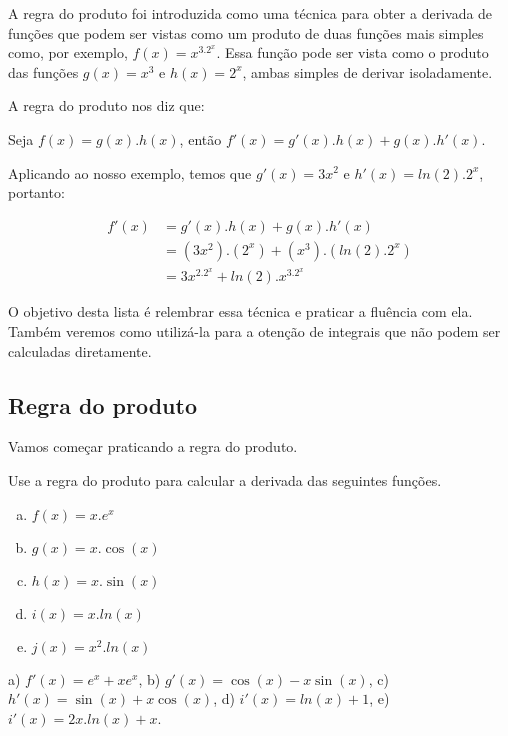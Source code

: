 \documentclass[main_estudante.tex]{subfiles}
\begin{document}
A regra do produto foi introduzida como uma técnica para obter a derivada de funções que podem ser vistas como um produto de duas funções mais simples como, por exemplo, $f(x)=x^3.2^x$. Essa função pode ser vista como o produto das funções $g(x)=x^3$ e $h(x)=2^x$, ambas simples de derivar isoladamente.

A regra do produto nos diz que:

\begin{shaded*}
Seja $f(x)=g(x).h(x)$, então $f'(x)=g'(x).h(x)+g(x).h'(x)$.
\end{shaded*}

Aplicando ao nosso exemplo, temos que $g'(x)=3x^2$ e $h'(x)=ln(2).2^x$, portanto:

\begin{align*}
f'(x) &= g'(x).h(x)+g(x).h'(x) \\
 &= (3x^2) . (2^x) + (x^3) . (ln(2).2^x) \\
 &= 3x^2.2^x + ln(2).x^3.2^x
\end{align*}

O objetivo desta lista é relembrar essa técnica e praticar a fluência com ela. Também veremos como utilizá-la para a otenção de integrais que não podem ser calculadas diretamente.

\subsection*{Regra do produto}

Vamos começar praticando a regra do produto.


\begin{questao}
Use a regra do produto para calcular a derivada das seguintes funções.
\begin{enumerate}[a)]
\item $f(x)=x . e^x$
\item $g(x)=x . \cos(x)$
\item $h(x)=x . \sin(x)$
\item $i(x)=x. ln(x)$
\item $j(x)=x^2 . ln(x)$
\end{enumerate}
\end{questao}

\begin{gabarito}
	\begin{gabaritoQuestao}
		a) $f'(x)=e^x+xe^x$, b) $g'(x)=\cos(x)-x\sin(x)$, c) $h'(x)=\sin(x)+x\cos(x)$, d) $i'(x)=ln(x)+1$, e) $i'(x)=2x.ln(x)+x$.
	\end{gabaritoQuestao}
\end{gabarito}
\end{document}
